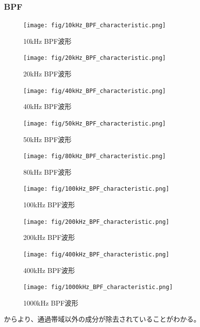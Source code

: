 \documentclass[11pt,dvipdfmx]{jarticle}
\begin{document}
\subsubsection{BPF}
\begin{figure}[H]
  \centering
  \texttt{[image: fig/10kHz\_BPF\_characteristic.png]}
  \caption{10kHz BPF波形}
  \label{fig:10kHz_BPF}
\end{figure}
\begin{figure}[H]
  \centering
  \texttt{[image: fig/20kHz\_BPF\_characteristic.png]}
  \caption{20kHz BPF波形}
  \label{fig:20kHz_BPF}
\end{figure}
\begin{figure}[H]
  \centering
  \texttt{[image: fig/40kHz\_BPF\_characteristic.png]}
  \caption{40kHz BPF波形}
  \label{fig:40kHz_BPF}
\end{figure}
\begin{figure}[H]
  \centering
  \texttt{[image: fig/50kHz\_BPF\_characteristic.png]}
  \caption{50kHz BPF波形}
  \label{fig:50kHz_BPF}
\end{figure}
\begin{figure}[H]
  \centering
  \texttt{[image: fig/80kHz\_BPF\_characteristic.png]}
  \caption{80kHz BPF波形}
  \label{fig:80kHz_BPF}
\end{figure}
\begin{figure}[H]
  \centering
  \texttt{[image: fig/100kHz\_BPF\_characteristic.png]}
  \caption{100kHz BPF波形}
  \label{fig:100kHz_BPF}
\end{figure}
\begin{figure}[H]
  \centering
  \texttt{[image: fig/200kHz\_BPF\_characteristic.png]}
  \caption{200kHz BPF波形}
  \label{fig:200kHz_BPF}
\end{figure}
\begin{figure}[H]
  \centering
  \texttt{[image: fig/400kHz\_BPF\_characteristic.png]}
  \caption{400kHz BPF波形}
  \label{fig:400kHz_BPF}
\end{figure}
\begin{figure}[H]
  \centering
  \texttt{[image: fig/1000kHz\_BPF\_characteristic.png]}
  \caption{1000kHz BPF波形}
  \label{fig:1000kHz_BPF}
\end{figure}
からより、通過帯域以外の成分が除去されていることがわかる。
\end{document}
